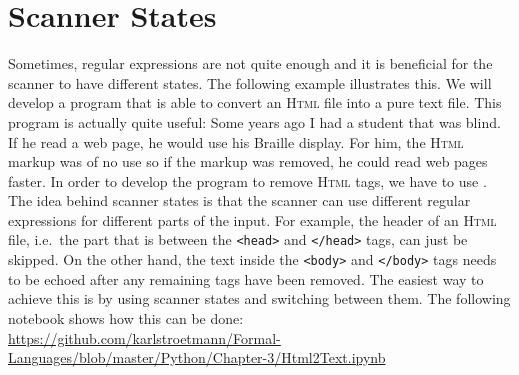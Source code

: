 \section{Scanner States}
Sometimes, regular expressions are not quite enough and it is beneficial for the scanner to have different
states.  The following example illustrates this.  We will develop a program that is able to convert an 
\textsc{Html} file into a pure text file.  This program is actually quite useful: Some years ago I
had a student that was blind.  If he read a web page, he would use his Braille display.  For him,
the \textsc{Html} markup was of no use so if the markup was removed, he could read web pages faster.
In order to develop the program to remove \textsc{Html} tags, we have to use .
  The idea behind scanner states is that the scanner can use different regular
expressions for different parts of the input.  For example, the header of an \textsc{Html} file, i.e.~the part
that is between the \texttt{<head>} and \texttt{</head>} tags, can just be
skipped.  On the other hand, the text inside the \texttt{<body>} and \texttt{</body>} tags needs to be echoed
after any remaining tags have been removed.  The easiest way to achieve this is by using scanner states and
switching between them.  The following notebook shows how this can be done:
\\[0.2cm]
\hspace*{1.3cm}
\href{https://github.com/karlstroetmann/Formal-Languages/blob/master/Python/Chapter-3/Html2Text.ipynb}{https://github.com/karlstroetmann/Formal-Languages/blob/master/Python/Chapter-3/Html2Text.ipynb}
\\

